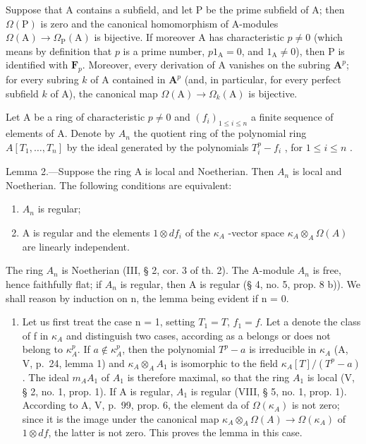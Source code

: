 Suppose that A contains a subfield, and let P be the prime subfield of A; then \(\Omega(\mathrm{P})\) is zero and the canonical homomorphism of A-modules \(\Omega(\mathrm{A}) \to \Omega_{\mathrm{P}}(\mathrm{A})\) is bijective. If moreover A has characteristic \(p \neq 0\) (which means by definition that \(p\) is a prime number, \(p1_{\mathrm{A}} = 0\), and \(1_{\mathrm{A}} \neq 0\)), then P is identified with \(\mathbf{F}_p\). Moreover, every derivation of A vanishes on the subring \(\mathbf{A}^p\); for every subring \(k\) of A contained in \(\mathbf{A}^p\) (and, in particular, for every perfect subfield \(k\) of A), the canonical map \(\Omega(\mathrm{A}) \to \Omega_k(\mathrm{A})\) is bijective.

Let A be a ring of characteristic \(p \neq 0\) and \((f_i)_{1 \leqslant i \leqslant n}\) a finite sequence of elements of A. Denote by \(A_n\) the quotient ring of the polynomial ring \(A[T_1, \ldots, T_n]\) by the ideal generated by the polynomials \(T_i^p - f_i\) , for \(1 \leqslant i \leqslant n\) .

Lemma 2.—Suppose the ring A is local and Noetherian. Then \(A_{n}\) is local and Noetherian. The following conditions are equivalent:

\begin{enumerate}
\def\labelenumi{(\roman{enumi})}
\item
  \(A_{n}\) is regular;
\item
  A is regular and the elements \(1 \otimes df_{i}\) of the \(\kappa_{A}\) -vector space \(\kappa_{A} \otimes_{A} \Omega(A)\) are linearly independent.
\end{enumerate}

The ring \(A_{n}\) is Noetherian (III, § 2, cor. 3 of th. 2). The A-module \(A_{n}\) is free, hence faithfully flat; if \(A_{n}\) is regular, then A is regular (§ 4, no. 5, prop. 8 b)). We shall reason by induction on n, the lemma being evident if n = 0.

\begin{enumerate}
\def\labelenumi{\Alph{enumi})}
\tightlist
\item
  Let us first treat the case n = 1, setting \(T_{1} = T\), \(f_{1} = f\). Let a denote the class of f in \(\kappa_{A}\) and distinguish two cases, according as a belongs or does not belong to \(\kappa_{A}^{p}\). If \(a \notin \kappa_{A}^{p}\), then the polynomial \(T^{p} - a\) is irreducible in \(\kappa_{A}\) (A, V, p.~24, lemma 1) and \(\kappa_{A} \otimes_{A} A_{1}\) is isomorphic to the field \(\kappa_{A}[T]/(T^{p} - a)\). The ideal \(m_{A}A_{1}\) of \(A_{1}\) is therefore maximal, so that the ring \(A_{1}\) is local (V, § 2, no. 1, prop. 1). If A is regular, \(A_{1}\) is regular (VIII, § 5, no. 1, prop. 1). According to A, V, p.~99, prop. 6, the element da of \(\Omega(\kappa_{A})\) is not zero; since it is the image under the canonical map \(\kappa_{A} \otimes_{A} \Omega(A) \to \Omega(\kappa_{A})\) of \(1 \otimes df\), the latter is not zero. This proves the lemma in this case.
\end{enumerate}

